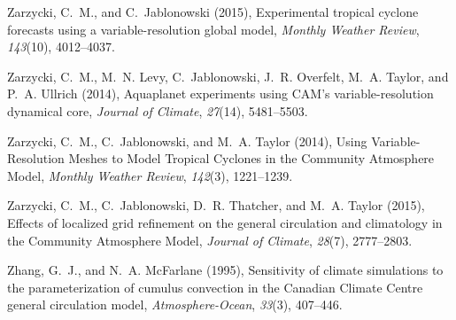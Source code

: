 \documentclass[ms]{agutex}   %
\begin{document}
\begin{article}
\begin{thebibliography}{84}
Zarzycki, C.~M., and C.~Jablonowski (2015), {Experimental tropical cyclone
  forecasts using a variable-resolution global model}, \textit{Monthly Weather
  Review}, \textit{143}(10), 4012--4037.

Zarzycki, C.~M., M.~N. Levy, C.~Jablonowski, J.~R. Overfelt, M.~A. Taylor, and
  P.~A. Ullrich (2014{}), {Aquaplanet experiments using CAM's
  variable-resolution dynamical core}, \textit{Journal of Climate},
  \textit{27}(14), 5481--5503.

Zarzycki, C.~M., C.~Jablonowski, and M.~A. Taylor (2014{}), {Using
  Variable-Resolution Meshes to Model Tropical Cyclones in the Community
  Atmosphere Model}, \textit{Monthly Weather Review}, \textit{142}(3),
  1221--1239.

Zarzycki, C.~M., C.~Jablonowski, D.~R. Thatcher, and M.~A. Taylor (2015),
  {Effects of localized grid refinement on the general circulation and
  climatology in the Community Atmosphere Model}, \textit{Journal of Climate},
  \textit{28}(7), 2777--2803.

Zhang, G.~J., and N.~A. McFarlane (1995), {Sensitivity of climate simulations
  to the parameterization of cumulus convection in the Canadian Climate Centre
  general circulation model}, \textit{Atmosphere-Ocean}, \textit{33}(3),
  407--446.

\end{thebibliography}



\end{article}


\clearpage
\end{document}
